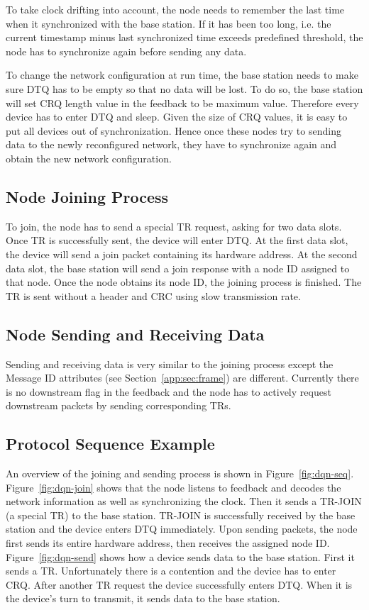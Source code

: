 \documentclass{article}
\begin{document}
To take clock drifting into account, the node needs to remember the last time when it synchronized with the base station. If it has been too long, i.e. the current timestamp minus last synchronized time exceeds predefined threshold, the node has to synchronize again before sending any data.

To change the network configuration at run time, the base station needs to make sure DTQ has to be empty so that no data will be lost. To do so, the base station will set CRQ length value in the feedback to be maximum value. Therefore every device has to enter DTQ and sleep. Given the size of CRQ values, it is easy to put all devices out of synchronization. Hence once these nodes try to sending data to the newly reconfigured network, they have to synchronize again and obtain the new network configuration.

\subsection{Node Joining Process}
To join, the node has to send a special TR request, asking for two data slots. Once TR is successfully sent, the device will enter DTQ. At the first data slot, the device will send a join packet containing its hardware address. At the second data slot, the base station will send a join response with a node ID assigned to that node. Once the node obtains its node ID, the joining process is finished. The TR is sent without a header and CRC using slow transmission rate.

\subsection{Node Sending and Receiving Data}
Sending and receiving data is very similar to the joining process except the Message ID attributes (see Section~\ref{app:sec:frame}) are different. Currently there is no downstream flag in the feedback and the node has to actively request downstream packets by sending corresponding TRs.

\subsection{Protocol Sequence Example}
An overview of the joining and sending process is shown in Figure~\ref{fig:dqn-seq}. Figure~\ref{fig:dqn-join} shows that the node listens to feedback and decodes the network information as well as synchronizing the clock. Then it sends a TR-JOIN (a special TR) to the base station. TR-JOIN is successfully received by the base station and the device enters DTQ immediately. Upon sending packets, the node first sends its entire hardware address, then receives the assigned node ID. Figure~\ref{fig:dqn-send} shows how a device sends data to the base station. First it sends a TR. Unfortunately there is a contention and the device has to enter CRQ. After another TR request the device successfully enters DTQ. When it is the device's turn to transmit, it sends data to the base station.
\end{document}
